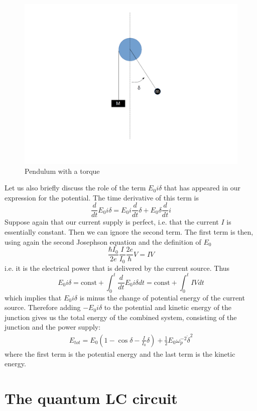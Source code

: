 \documentclass[a4paper, draft]{article}
\theoremstyle{own}
\theoremstyle{remark}
\begin{document}
\begin{figure}[ht]
\centering
\includegraphics[width=0.7\linewidth]{images/Pendulum}
\caption[Pendulum with a torque]{Pendulum with a torque}
\label{fig:Pendulum}
\end{figure}

Let us also briefly discuss the role of the term $E_0 i \delta$ that has appeared in our expression for the potential. The time derivative of this term is
$$
\frac{d}{dt} E_0 i \delta = E_0 i \frac{d}{dt} \delta + E_0 \delta \frac{d}{dt} i
$$
Suppose again that our current supply is perfect, i.e. that the current $I$ is essentially constant. Then we can ignore the second term. The first term is then, using again the second Josephson equation and the definition of $E_0$
$$
\frac{\hbar I_0}{2e} \frac{I}{I_0} \frac{2e}{\hbar} V = IV
$$
i.e. it is the electrical power that is delivered by the current source. Thus 
$$
E_0 i \delta = \text{const} + \int_0^t \frac{d}{dt} E_0 i \delta dt
= \text{const} + \int_0^t IV dt 
$$
which implies that $E_0 i \delta$ is minus the change of potential energy of the current source. Therefore adding $-E_0 i \delta$ to the potential and kinetic energy of the junction gives us the total energy of the combined system, consisting of the junction and the power supply:
\begin{align}
\label{eq:totalenergy}
E_{tot} = E_0(1 - \cos \delta  - \frac{I}{I_0} \delta)  +\frac{1}{2} E_0 \omega_p^{-2} \dot{\delta}^2
\end{align}
where the first term is the potential energy and the last term is the kinetic energy.


\section{The quantum LC circuit}
\end{document}
